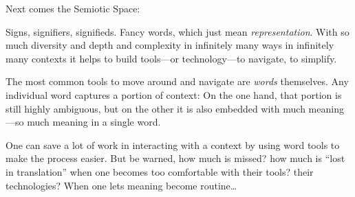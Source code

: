 \documentclass[twoside]{article}
\begin{document}
Next comes the Semiotic Space:\vspace*{0.65cm}

Signs, signifiers, signifieds. Fancy words, which just mean \emph{representation}. With so much diversity and depth and complexity
in infinitely many ways in infinitely many contexts it helps to build tools---or technology---to navigate, to simplify.

The most common tools to move around and navigate are \emph{words} themselves. Any individual word captures a portion of context:
On the one hand, that portion is still highly ambiguous, but on the other it is also embedded with much meaning---so much meaning
in a single word.

One can save a lot of work in interacting with a context by using word tools to make the process easier. But be warned, how much is missed?
how much is ``lost in translation'' when one becomes too comfortable with their tools? their technologies?
When one lets meaning become routine\ldots

\newpage
\end{document}
